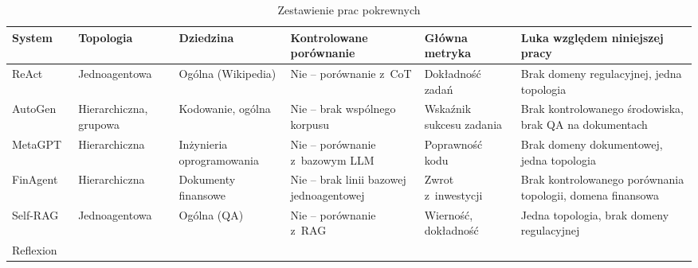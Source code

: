 \begin{table}
  \caption{Zestawienie prac pokrewnych}\label{tab:zestawienie-prac-pokrewnych}
  \centering
  \small
  \renewcommand{\arraystretch}{1.3}
  \begin{tabularx}{0.95\textheight}{@{} p{2.8cm} p{2.8cm} p{3.5cm} p{3.5cm} p{3.5cm} X @{}}
    \toprule
    \textbf{System}
     & \textbf{Topologia}
     & \textbf{Dziedzina}
     & \textbf{Kontrolowane porównanie}
     & \textbf{Główna metryka}
     & \textbf{Luka względem niniejszej pracy}                                                        \\
    \midrule
    ReAct~\cite{yao2022react}
     & Jednoagentowa                                                      & Ogólna (Wikipedia)
     & Nie -- porównanie z~CoT                                            & Dokładność zadań
     & Brak domeny regulacyjnej, jedna topologia                                                      \\
    \addlinespace
    AutoGen~\cite{wu2024autogen}
     & Hierarchiczna, grupowa                                             & Kodowanie, ogólna
     & Nie -- brak wspólnego korpusu                                      & Wskaźnik sukcesu zadania
     & Brak kontrolowanego środowiska, brak QA na dokumentach                                         \\
    \addlinespace
    MetaGPT~\cite{hong2023metagpt}
     & Hierarchiczna                                                      & Inżynieria oprogramowania
     & Nie -- porównanie z~bazowym LLM                                    & Poprawność kodu
     & Brak domeny dokumentowej, jedna topologia                                                      \\
    \addlinespace
    FinAgent~\cite{zhang2024multimodal}
     & Hierarchiczna                                                      & Dokumenty finansowe
     & Nie -- brak linii bazowej jednoagentowej                           & Zwrot z~inwestycji
     & Brak kontrolowanego porównania topologii, domena finansowa                                     \\
    \addlinespace
    Self-RAG~\cite{asai2023self}
     & Jednoagentowa                                                      & Ogólna (QA)
     & Nie -- porównanie z~RAG                                            & Wierność, dokładność
     & Jedna topologia, brak domeny regulacyjnej                                                      \\
    \addlinespace
    Reflexion~\cite{shinn2024reflexion}

\end{tabularx}
\end{table}
